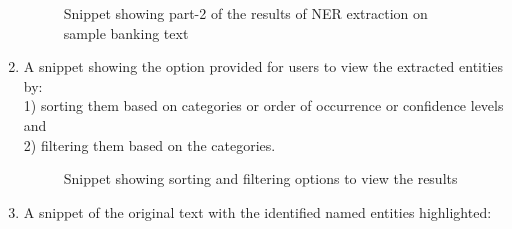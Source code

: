 \begin{enumerate}
\begin {figure}[h!h]
        \caption{Snippet showing part-2 of the results of NER extraction on sample banking text}
        \label{nerres2}
    \end {figure}
    \newpage
    \item A snippet showing the option provided for users to view the extracted entities by:\\
    1) sorting them based on categories or order of occurrence or confidence levels and \\
    2) filtering them based on the categories.
        \begin {figure}[h!h]
            \centering
            \caption{Snippet showing sorting and filtering options to view the results}
            \label{sortfilternerres}
        \end {figure}
    \item A snippet of the original text with the identified named entities highlighted:
        \begin {figure}[h!h]
            \centering

\end{figure}
\end{enumerate}
